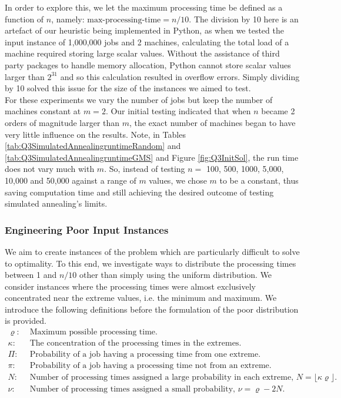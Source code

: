 \documentclass[12pt,a4paper,reqno]{article}
\begin{document}
In order to explore this, we let the maximum processing time be defined as a function of $n$, namely: $\text{max-processing-time}=n/10$. The division by 10 here is an artefact of our heuristic being implemented in Python, as when we tested the input instance of 1,000,000 jobs and 2 machines, calculating the total load of a machine required storing large scalar values. Without the assistance of third party packages to handle memory allocation, Python cannot store scalar values larger than $2^{31}$ and so this calculation resulted in overflow errors. Simply dividing by 10 solved this issue for the size of the instances we aimed to test. \\

For these experiments we vary the number of jobs but keep the number of machines constant at $m=2$. Our initial testing indicated that when $n$ became 2 orders of magnitude larger than $m$, the exact number of machines began to have very little influence on the results. Note, in Tables \ref{tab:Q3SimulatedAnnealingruntimeRandom} and  \ref{tab:Q3SimulatedAnnealingruntimeGMS} and Figure \ref{fig:Q3InitSol}, the run time does not vary much with $m$. So, instead of testing $n=$ 100, 500, 1000, 5,000, 10,000 and 50,000 against a range of $m$ values, we chose $m$ to be a constant, thus saving computation time and still achieving the desired outcome of testing simulated annealing's limits. \\

\subsubsection{Engineering Poor Input Instances}
We aim to create instances of the problem which are particularly difficult to solve to optimality. To this end, we investigate ways to distribute the processing times between 1 and $n/10$ other than simply using the uniform distribution. We consider instances where the processing times were almost exclusively concentrated near the extreme values, i.e. the minimum and maximum. We introduce the following definitions before the formulation of the poor distribution is provided.
\begin{align}
\varrho: & \text{ Maximum possible processing time.} \nonumber\\
\kappa: & \text{ The concentration of the processing times in the extremes.} \nonumber\\
\Pi: & \text{ Probability of a job having a processing time from one extreme.} \nonumber\\
\pi: & \text{ Probability of a job having a processing time not from an extreme.} \nonumber\\
N: & \text{ Number of processing times assigned a large probability in each extreme, } N =\lfloor \kappa\varrho \rfloor. \nonumber\\
\nu: & \text{ Number of processing times assigned a small probability, } \nu =\varrho - 2N. \nonumber
\
\end{align}
\end{document}
